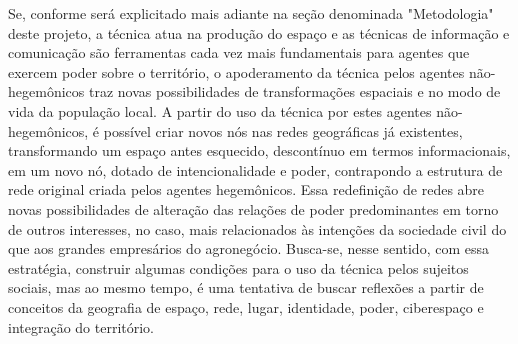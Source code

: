 Se, conforme será explicitado mais adiante na seção denominada "Metodologia" deste projeto, a técnica atua na produção do espaço e as técnicas de informação e comunicação são ferramentas cada vez mais fundamentais para agentes que exercem poder sobre o território, o apoderamento da técnica pelos agentes não-hegemônicos traz novas possibilidades de transformações espaciais e no modo de vida da população local. A partir do uso da técnica por estes agentes não-hegemônicos, é possível criar novos nós nas redes geográficas já existentes, transformando um espaço antes esquecido, descontínuo em termos informacionais, em um novo nó, dotado de intencionalidade e poder, contrapondo a estrutura de rede original criada pelos agentes hegemônicos. Essa redefinição de redes abre novas possibilidades de alteração das relações de poder predominantes em torno de outros interesses, no caso, mais relacionados às intenções da sociedade civil do que aos grandes empresários do agronegócio. Busca-se, nesse sentido, com essa estratégia, construir algumas condições para o uso da técnica pelos sujeitos sociais, mas ao mesmo tempo, é uma tentativa de buscar reflexões a partir de conceitos da geografia de espaço, rede, lugar, identidade, poder, ciberespaço e integração do território.
